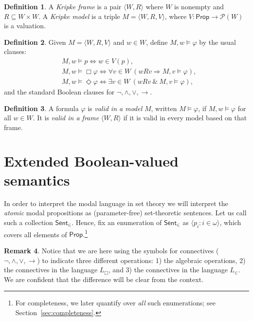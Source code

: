 \documentclass[11pt]{amsart}
\theoremstyle{definition}
\newtheorem{definition}{Definition}[section]
\newtheorem{remark}[definition]{Remark}
\theoremstyle{plain}
\newcommand{\Pow}{\mathcal P}
\newcommand{\Prop}{\mathsf{Prop}}
\newcommand{\Sent}{\mathsf{Sent}}
\begin{document}
\begin{definition}
A \emph{Kripke frame} is a pair $\langle W,R\rangle$ where $W$ is nonempty and $R\subseteq W\times W$.
A \emph{Kripke model} is a triple $M=\langle W,R,V\rangle$, where $V:\Prop\to \Pow(W)$ is a valuation.
\end{definition}

\begin{definition}\label{def:sat}
Given $M=\langle W,R,V\rangle$ and $w\in W$, define $M,w\models\varphi$ by the usual clauses:
\[
\begin{aligned}
&M,w\models p \iff w\in V(p),\\
&M,w\models \Box\varphi \iff \forall v\in W\ (wRv\Rightarrow M,v\models\varphi),\\
&M,w\models \Diamond\varphi \iff \exists v\in W\ (wRv\ \&\ M,v\models\varphi),
\end{aligned}
\]
and the standard Boolean clauses for $\neg,\wedge,\vee,\to$.
\end{definition}

\begin{definition}
A formula $\varphi$ is \emph{valid in a model} $M$, written $M\models \varphi$, if $M,w\models\varphi$ for all
$w\in W$. It is \emph{valid in a frame} $\langle W,R\rangle$ if it is valid in every model based on that frame.
\end{definition}

\section{Extended Boolean-valued semantics}\label{sec:extended-semantics}

In order to interpret the modal language in set theory we will interpret the \emph{atomic} modal propositions as (parameter-free) set-theoretic sentences. Let us call such a collection $\Sent_{\in}$.
Hence, fix an enumeration of $\Sent_{\in}$ as $\langle p_i:i\in\omega\rangle$, which covers all elements of $\Prop$.\footnote{For completeness, we later quantify over \emph{all} such enumerations; see Section~\ref{sec:completeness}.}

\begin{remark}
Notice that we are here using the symbols for connectives ($\neg, \land,  \lor, \to$) to indicate three different operations: 1) the algebraic operations, 2) the connectives in the language $L_\Box$, and 3) the connectives in the language $L_\in$. We are confident that the difference will be clear from the context.
\end{remark}
\end{document}
